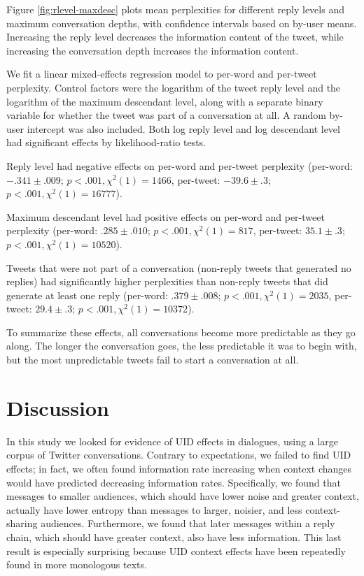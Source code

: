 \documentclass[11pt,letterpaper]{article}
\begin{document}
Figure \ref{fig:rlevel-maxdesc} plots mean perplexities for different reply levels and maximum conversation depths, with confidence intervals based on by-user means. Increasing the reply level decreases the information content of the tweet, while increasing the conversation depth increases the information content.

We fit a linear mixed-effects regression model to per-word and per-tweet perplexity.  Control factors were the logarithm of the tweet reply level and the logarithm of the maximum descendant level, along with a separate binary variable for whether the tweet was part of a conversation at all. A random by-user intercept was also included.  Both log reply level and log descendant level had significant effects by likelihood-ratio tests.

Reply level had negative effects on per-word and per-tweet perplexity (per-word: $-.341 \pm .009$; $p < .001, \chi^2(1) = 1466$, per-tweet: $-39.6 \pm .3$; $p < .001, \chi^2(1) =  16777$).

Maximum descendant level had positive effects on per-word and per-tweet perplexity (per-word: $.285 \pm .010$; $p < .001, \chi^2(1) = 817$, per-tweet: $35.1 \pm .3$; $p < .001, \chi^2(1) = 10520$).

Tweets that were not part of a conversation (non-reply tweets that generated no replies) had significantly higher perplexities than non-reply tweets that did generate at least one reply (per-word: $.379 \pm .008$; $p < .001, \chi^2(1) = 2035$, per-tweet: $29.4 \pm .3$; $p < .001, \chi^2(1) = 10372$).  

To summarize these effects, all conversations become more predictable as they go along. The longer the conversation goes, the less predictable it was to begin with, but the most unpredictable tweets fail to start a conversation at all.

\section{Discussion}

In this study we looked for evidence of UID effects in dialogues, using a large corpus of Twitter conversations.  Contrary to expectations, we failed to find UID effects; in fact, we often found information rate increasing when context changes would have predicted decreasing information rates.  Specifically, we found that messages to smaller audiences, which should have lower noise and greater context, actually have lower entropy than messages to larger, noisier, and less context-sharing audiences. Furthermore, we found that later messages within a reply chain, which should have greater context, also have less information.  This last result is especially surprising because UID context effects have been repeatedly found in more monologous texts.
\end{document}
